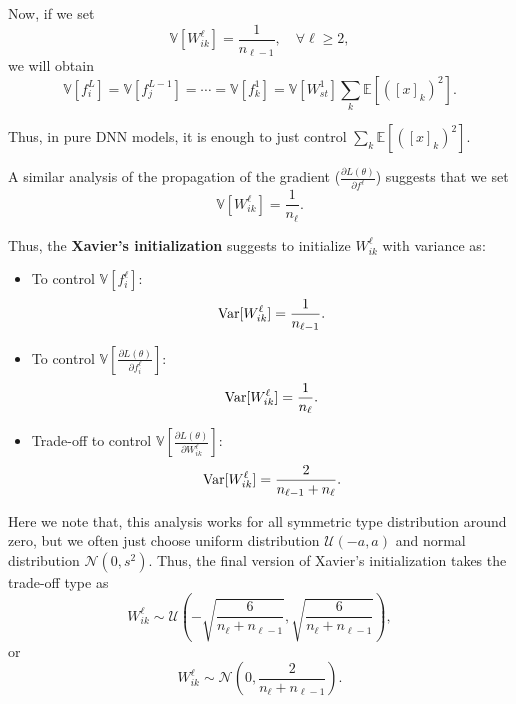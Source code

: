 Now, if we set 
\begin{equation}\label{key}
\mathbb{V}[W^\ell_{ik}] = \frac{1}{n_{\ell-1}}, \quad \forall \ell \ge 2,
\end{equation}
we will obtain
\begin{equation}
\mathbb V [f^{L}_i] = \mathbb V [f^{L-1}_j] = \cdots =  \mathbb V [f^{1}_k] = \mathbb{V}[W^1_{st}]\sum_{k}\mathbb{E}[( [x]_k)^2].
\end{equation}

Thus, in pure DNN models, it is enough to just control $\sum_{k}\mathbb{E}[( [x]_k)^2]$.

A similar analysis of the propagation of the gradient ($\frac{\partial L(\theta)}{\partial f^\ell}$) suggests that we set 
\begin{equation}\label{key}
\mathbb{V}[W^\ell_{ik}] = \frac{1}{n_{\ell}}.
\end{equation}


Thus, the {\bf Xavier's initialization} suggests to initialize $W^\ell_{ik}$ with variance as:
\begin{itemize}
	\item To control $\mathbb V [f^{\ell}_i] $:
	\begin{equation}\label{key}
	{\rm Var}[W^\ell_{ik}] = \frac{1}{n_{\ell-1}}.
	\end{equation}
	\item To control $\mathbb{V}[\frac{\partial L(\theta)}{\partial f_i^\ell}]$:
	\begin{equation}\label{key}
	{\rm Var}[W^\ell_{ik}] = \frac{1}{n_{\ell}}.
	\end{equation}
	\item Trade-off to control $\mathbb{V} [\frac{\partial L(\theta)}{\partial W_{ik}^\ell}]$: 
	\begin{equation}\label{key}
	{\rm Var}[W^\ell_{ik}] = \frac{2}{n_{\ell-1} + n_\ell}.
	\end{equation}
\end{itemize}

Here we note that, this analysis works for all symmetric type distribution around zero, 
but we often just choose uniform distribution $\mathcal U(-a,a)$ and normal distribution $\mathcal N(0,s^2)$.
Thus, the final version of Xavier's initialization takes the trade-off type as
\begin{equation}
W^{\ell}_{ik} \sim \mathcal{U}(-\sqrt{\frac{6}{n_\ell+n_{\ell-1}}}, \sqrt{\frac{6}{n_\ell+n_{\ell-1}}}),
\end{equation}
or
\begin{equation}
W^{\ell}_{ik} \sim \mathcal{N}(0,  {\frac{2}{n_\ell+n_{\ell-1}}}).
\end{equation}



